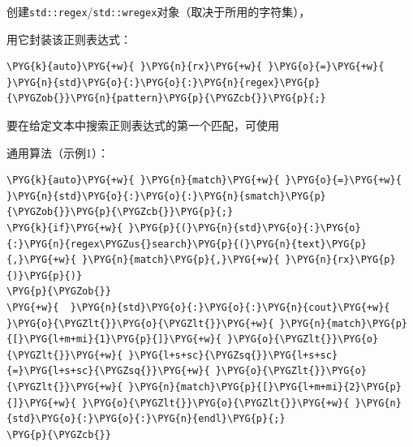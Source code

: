
创建\texttt{std::\allowbreak{}regex}/\texttt{std::\allowbreak{}wregex}对象（取决于所用的字符集），



用它封装该正则表达式：



\begin{codeblockbg}
\begin{Verbatim}[commandchars=\\\{\},breaklines=true,breakanywhere=true,fontsize=\codefont,xleftmargin=17bp]
\PYG{k}{auto}\PYG{+w}{ }\PYG{n}{rx}\PYG{+w}{ }\PYG{o}{=}\PYG{+w}{ }\PYG{n}{std}\PYG{o}{:}\PYG{o}{:}\PYG{n}{regex}\PYG{p}{\PYGZob{}}\PYG{n}{pattern}\PYG{p}{\PYGZcb{}}\PYG{p}{;}
\end{Verbatim}
\end{codeblockbg}



要在给定文本中搜索正则表达式的第一个匹配，可使用



通用算法（示例1）：



\begin{codeblockbg}
\begin{Verbatim}[commandchars=\\\{\},breaklines=true,breakanywhere=true,fontsize=\codefont,xleftmargin=17bp]
\PYG{k}{auto}\PYG{+w}{ }\PYG{n}{match}\PYG{+w}{ }\PYG{o}{=}\PYG{+w}{ }\PYG{n}{std}\PYG{o}{:}\PYG{o}{:}\PYG{n}{smatch}\PYG{p}{\PYGZob{}}\PYG{p}{\PYGZcb{}}\PYG{p}{;}
\PYG{k}{if}\PYG{+w}{ }\PYG{p}{(}\PYG{n}{std}\PYG{o}{:}\PYG{o}{:}\PYG{n}{regex\PYGZus{}search}\PYG{p}{(}\PYG{n}{text}\PYG{p}{,}\PYG{+w}{ }\PYG{n}{match}\PYG{p}{,}\PYG{+w}{ }\PYG{n}{rx}\PYG{p}{)}\PYG{p}{)}
\PYG{p}{\PYGZob{}}
\PYG{+w}{  }\PYG{n}{std}\PYG{o}{:}\PYG{o}{:}\PYG{n}{cout}\PYG{+w}{ }\PYG{o}{\PYGZlt{}}\PYG{o}{\PYGZlt{}}\PYG{+w}{ }\PYG{n}{match}\PYG{p}{[}\PYG{l+m+mi}{1}\PYG{p}{]}\PYG{+w}{ }\PYG{o}{\PYGZlt{}}\PYG{o}{\PYGZlt{}}\PYG{+w}{ }\PYG{l+s+sc}{\PYGZsq{}}\PYG{l+s+sc}{=}\PYG{l+s+sc}{\PYGZsq{}}\PYG{+w}{ }\PYG{o}{\PYGZlt{}}\PYG{o}{\PYGZlt{}}\PYG{+w}{ }\PYG{n}{match}\PYG{p}{[}\PYG{l+m+mi}{2}\PYG{p}{]}\PYG{+w}{ }\PYG{o}{\PYGZlt{}}\PYG{o}{\PYGZlt{}}\PYG{+w}{ }\PYG{n}{std}\PYG{o}{:}\PYG{o}{:}\PYG{n}{endl}\PYG{p}{;}
\PYG{p}{\PYGZcb{}}
\end{Verbatim}
\end{codeblockbg}


